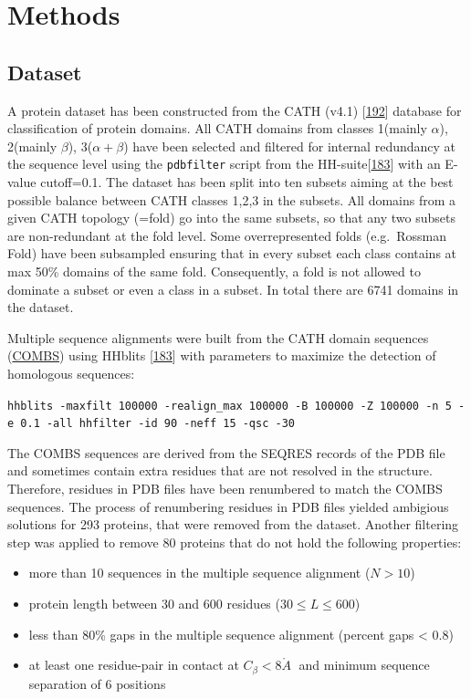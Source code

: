 \documentclass[11pt,a4paper,twoside]{book}
\providecommand{\tightlist}{%
  \setlength{\itemsep}{0pt}\setlength{\parskip}{0pt}}
\newcommand{\angstrom}{\mathring{A} \;}
\theoremstyle{definition}
\theoremstyle{definition}
\theoremstyle{remark}
\begin{document}
\newpage 

\section{Methods}\label{methods}

\subsection{Dataset}\label{dataset}

A protein dataset has been constructed from the CATH (v4.1)
{[}\protect\hyperlink{ref-Sillitoe2015}{192}{]} database for
classification of protein domains. All CATH domains from classes
1(mainly \(\alpha\)), 2(mainly \(\beta\)), 3(\(\alpha+\beta\)) have been
selected and filtered for internal redundancy at the sequence level
using the \texttt{pdbfilter} script from the
HH-suite{[}\protect\hyperlink{ref-Remmert2012}{183}{]} with an E-value
cutoff=0.1. The dataset has been split into ten subsets aiming at the
best possible balance between CATH classes 1,2,3 in the subsets. All
domains from a given CATH topology (=fold) go into the same subsets, so
that any two subsets are non-redundant at the fold level. Some
overrepresented folds (e.g.~Rossman Fold) have been subsampled ensuring
that in every subset each class contains at max 50\% domains of the same
fold. Consequently, a fold is not allowed to dominate a subset or even a
class in a subset. In total there are 6741 domains in the dataset.

Multiple sequence alignments were built from the CATH domain sequences
(\href{http://www.cathdb.info/version/current/domain/3cdjA03/sequence}{COMBS})
using HHblits {[}\protect\hyperlink{ref-Remmert2012}{183}{]} with
parameters to maximize the detection of homologous sequences:

\texttt{hhblits\ -maxfilt\ 100000\ -realign\_max\ 100000\ -B\ 100000\ -Z\ 100000\ -n\ 5\ -e\ 0.1\ -all\ hhfilter\ -id\ 90\ -neff\ 15\ -qsc\ -30}

The COMBS sequences are derived from the SEQRES records of the PDB file
and sometimes contain extra residues that are not resolved in the
structure. Therefore, residues in PDB files have been renumbered to
match the COMBS sequences. The process of renumbering residues in PDB
files yielded ambigious solutions for 293 proteins, that were removed
from the dataset. Another filtering step was applied to remove 80
proteins that do not hold the following properties:

\begin{itemize}
\tightlist
\item
  more than 10 sequences in the multiple sequence alignment (\(N>10\))
\item
  protein length between 30 and 600 residues (\(30 \leq L \leq 600\))
\item
  less than 80\% gaps in the multiple sequence alignment (percent gaps
  \textless{} 0.8)
\item
  at least one residue-pair in contact at \(C_\beta < 8\angstrom\) and
  minimum sequence separation of 6 positions
\end{itemize}
\end{document}
